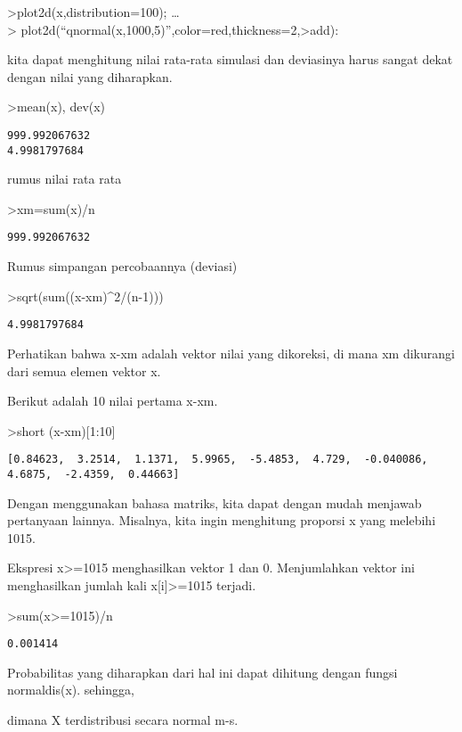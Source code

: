 \documentclass[
]{book}
\begin{document}
\textgreater plot2d(x,distribution=100); \ldots{}\\
\textgreater{} plot2d(``qnormal(x,1000,5)'',color=red,thickness=2,\textgreater add):

kita dapat menghitung nilai rata-rata simulasi dan deviasinya harus sangat dekat dengan nilai yang diharapkan.

\textgreater mean(x), dev(x)

\begin{verbatim}
999.992067632
4.9981797684
\end{verbatim}

rumus nilai rata rata

\textgreater xm=sum(x)/n

\begin{verbatim}
999.992067632
\end{verbatim}

Rumus simpangan percobaannya (deviasi)

\textgreater sqrt(sum((x-xm)\^{}2/(n-1)))

\begin{verbatim}
4.9981797684
\end{verbatim}

Perhatikan bahwa x-xm adalah vektor nilai yang dikoreksi, di mana xm dikurangi dari semua elemen vektor x.

Berikut adalah 10 nilai pertama x-xm.

\textgreater short (x-xm){[}1:10{]}

\begin{verbatim}
[0.84623,  3.2514,  1.1371,  5.9965,  -5.4853,  4.729,  -0.040086,
4.6875,  -2.4359,  0.44663]
\end{verbatim}

Dengan menggunakan bahasa matriks, kita dapat dengan mudah menjawab pertanyaan lainnya. Misalnya, kita ingin menghitung proporsi x yang melebihi 1015.

Ekspresi x\textgreater=1015 menghasilkan vektor 1 dan 0. Menjumlahkan vektor ini menghasilkan jumlah kali x{[}i{]}\textgreater=1015 terjadi.

\textgreater sum(x\textgreater=1015)/n

\begin{verbatim}
0.001414
\end{verbatim}

Probabilitas yang diharapkan dari hal ini dapat dihitung dengan fungsi normaldis(x). sehingga,

dimana X terdistribusi secara normal m-s.
\end{document}
